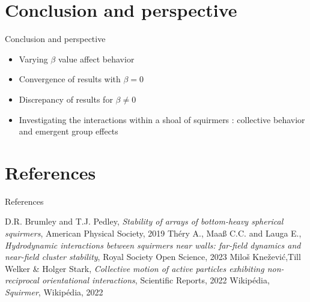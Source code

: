 \documentclass{beamer}
\begin{document}


\section{Conclusion and perspective}
\begin{frame}{Conclusion and perspective}
    \begin{center}
        \begin{itemize}
            \item Varying $\beta$ value affect behavior
            \item Convergence of results with $\beta = 0$
            \item Discrepancy of results for $\beta \ne 0$
            \item Investigating the interactions within a shoal of squirmers : collective behavior and emergent group effects
        \end{itemize}
    \end{center}
\end{frame}

\section{References}
\begin{frame}{References}
    \begin{thebibliography}{}
         D.R. Brumley and T.J. Pedley, \emph{Stability of arrays of bottom-heavy spherical squirmers}, American Physical Society, 2019
         Théry A., Maaß C.C. and Lauga E., \emph{Hydrodynamic interactions between squirmers near walls: far-field dynamics and near-field cluster stability}, Royal Society Open Science, 2023
         Miloš Knežević,Till Welker \& Holger Stark, \emph{Collective motion of active particles exhibiting non-reciprocal orientational interactions}, Scientific Reports, 2022
         Wikipédia, \emph{Squirmer}, Wikipédia, 2022
    \end{thebibliography}
\end{frame}
\end{document}

